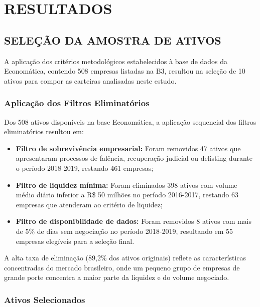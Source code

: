 
\chapter{RESULTADOS}

\section{SELEÇÃO DA AMOSTRA DE ATIVOS}

A aplicação dos critérios metodológicos estabelecidos à base de dados da Economática, contendo 508 empresas listadas na B3, resultou na seleção de 10 ativos para compor as carteiras analisadas neste estudo.

\subsection{Aplicação dos Filtros Eliminatórios}

Dos 508 ativos disponíveis na base Economática, a aplicação sequencial dos filtros eliminatórios resultou em:

\begin{itemize}
    \item \textbf{Filtro de sobrevivência empresarial:} Foram removidos 47 ativos que apresentaram processos de falência, recuperação judicial ou delisting durante o período 2018-2019, restando 461 empresas;
    
    \item \textbf{Filtro de liquidez mínima:} Foram eliminados 398 ativos com volume médio diário inferior a R\$ 50 milhões no período 2016-2017, restando 63 empresas que atenderam ao critério de liquidez;
    
    \item \textbf{Filtro de disponibilidade de dados:} Foram removidos 8 ativos com mais de 5\% de dias sem negociação no período 2018-2019, resultando em 55 empresas elegíveis para a seleção final.
\end{itemize}

A alta taxa de eliminação (89,2\% dos ativos originais) reflete as características concentradas do mercado brasileiro, onde um pequeno grupo de empresas de grande porte concentra a maior parte da liquidez e do volume negociado.

\subsection{Ativos Selecionados}

